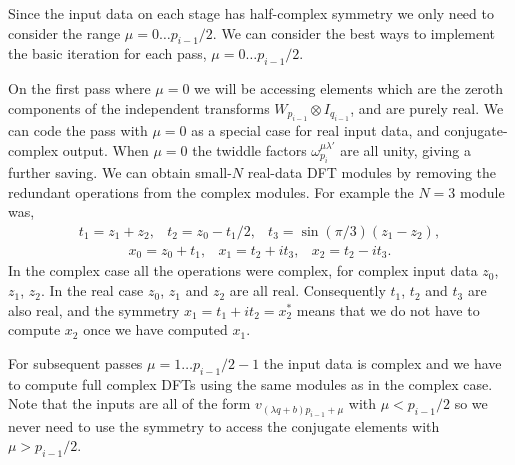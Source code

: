 \documentclass[fleqn,12pt]{article}
\begin{document}
Since the input data on each stage has half-complex symmetry we only
need to consider the range $\mu=0 \dots p_{i-1}/2$. We can consider
the best ways to implement the basic iteration for each pass, $\mu = 0
\dots p_{i-1}/2$.

On the first pass where $\mu=0$ we will be accessing elements which
are the zeroth components of the independent transforms $W_{p_{i-1}}
\otimes I_{q_{i-1}}$, and are purely real.
%
We can code the pass with $\mu=0$ as a special case for real input
data, and conjugate-complex output. When $\mu=0$ the twiddle factors
$\omega^{\mu\lambda'}_{p_i}$ are all unity, giving a further saving.
We can obtain small-$N$ real-data DFT modules by removing the
redundant operations from the complex modules.
%
For example the $N=3$ module was,
%
\begin{equation}
\begin{array}{lll}
t_1 = z_1 + z_2, &
t_2 = z_0 - t_1/2, &
t_3 = \sin(\pi/3) (z_1 - z_2), 
\end{array}
\end{equation}
\begin{equation}
\begin{array}{lll}
x_0 = z_0 + t_1, &
x_1 = t_2 + i t_3, &
x_2 = t_2 - i t_3. 
\end{array}
\end{equation}
%
In the complex case all the operations were complex, for complex input
data $z_0$, $z_1$, $z_2$. In the real case $z_0$, $z_1$ and $z_2$ are
all real. Consequently $t_1$, $t_2$ and $t_3$ are also real, and the
symmetry $x_1 = t_1 + i t_2 = x^*_2$ means that we do not have to
compute $x_2$ once we have computed $x_1$.

For subsequent passes $\mu = 1 \dots p_{i-1}/2 - 1$ the input data is
complex and we have to compute full complex DFTs using the same
modules as in the complex case. Note that the inputs are all of the
form $v_{(\lambda q + b) p_{i-1} + \mu}$ with $\mu < p_{i-1}/2$ so we
never need to use the symmetry to access the conjugate elements with
$\mu > p_{i-1}/2$.
\end{document}
